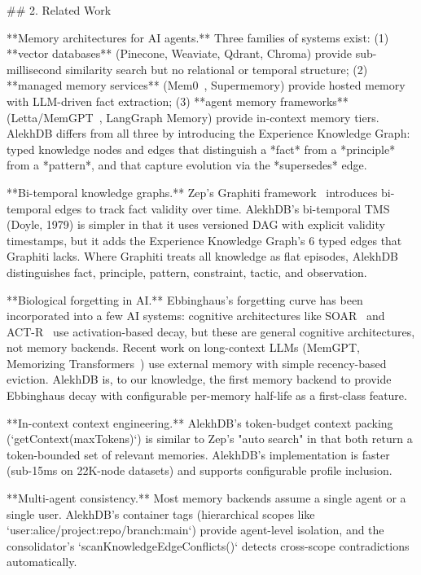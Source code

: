 ## 2. Related Work

**Memory architectures for AI agents.** Three families of systems exist: (1) **vector databases** (Pinecone, Weaviate, Qdrant, Chroma) provide sub-millisecond similarity search but no relational or temporal structure; (2) **managed memory services** (Mem0~\citep{mem0}, Supermemory) provide hosted memory with LLM-driven fact extraction; (3) **agent memory frameworks** (Letta/MemGPT~\citep{memgpt}, LangGraph Memory) provide in-context memory tiers. AlekhDB differs from all three by introducing the Experience Knowledge Graph: typed knowledge nodes and edges that distinguish a *fact* from a *principle* from a *pattern*, and that capture evolution via the *supersedes* edge.

**Bi-temporal knowledge graphs.** Zep's Graphiti framework~\citep{graphiti} introduces bi-temporal edges to track fact validity over time. AlekhDB's bi-temporal TMS (Doyle, 1979) is simpler in that it uses versioned DAG with explicit validity timestamps, but it adds the Experience Knowledge Graph's 6 typed edges that Graphiti lacks. Where Graphiti treats all knowledge as flat episodes, AlekhDB distinguishes fact, principle, pattern, constraint, tactic, and observation.

**Biological forgetting in AI.** Ebbinghaus's forgetting curve has been incorporated into a few AI systems: cognitive architectures like SOAR~\citep{soar} and ACT-R~\citep{actr} use activation-based decay, but these are general cognitive architectures, not memory backends. Recent work on long-context LLMs (MemGPT, Memorizing Transformers~\citep{memtransformers}) use external memory with simple recency-based eviction. AlekhDB is, to our knowledge, the first memory backend to provide Ebbinghaus decay with configurable per-memory half-life as a first-class feature.

**In-context context engineering.** AlekhDB's token-budget context packing (`getContext(maxTokens)`) is similar to Zep's "auto search" in that both return a token-bounded set of relevant memories. AlekhDB's implementation is faster (sub-15ms on 22K-node datasets) and supports configurable profile inclusion.

**Multi-agent consistency.** Most memory backends assume a single agent or a single user. AlekhDB's container tags (hierarchical scopes like `user:alice/project:repo/branch:main`) provide agent-level isolation, and the consolidator's `scanKnowledgeEdgeConflicts()` detects cross-scope contradictions automatically.

